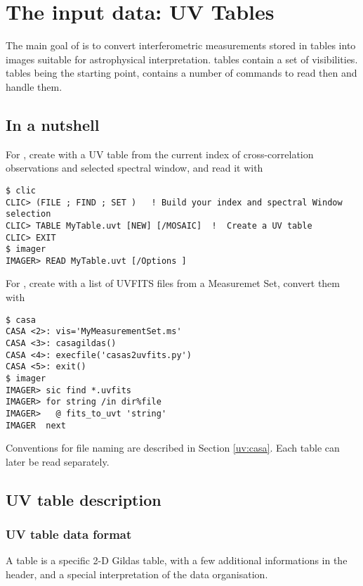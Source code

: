 \section{The input data: UV Tables}
\label{sec:uvtables}

The main goal of \imager{} is to convert interferometric measurements 
stored in \uv{} tables into images suitable for astrophysical interpretation. 
\uv{} tables contain a set of visibilities. \uv{} tables being the
starting point, \imager{} contains a number of commands to read then
and handle them.

\subsection{In a nutshell}

For \NOEMA{}, create with \clic{} a UV table from the current
index of cross-correlation observations and selected spectral window, 
and read it with \imager{}
\begin{verbatim}
$ clic
CLIC> (FILE ; FIND ; SET )   ! Build your index and spectral Window selection
CLIC> TABLE MyTable.uvt [NEW] [/MOSAIC]  !  Create a UV table
CLIC> EXIT
$ imager
IMAGER> READ MyTable.uvt [/Options ]
\end{verbatim}

For \ALMA{}, create with \casa{} a list of UVFITS files from a 
Measuremet Set, convert them with \imager{}
\begin{verbatim}
$ casa
CASA <2>: vis='MyMeasurementSet.ms'
CASA <3>: casagildas()
CASA <4>: execfile('casas2uvfits.py')
CASA <5>: exit()
$ imager
IMAGER> sic find *.uvfits
IMAGER> for string /in dir%file
IMAGER>   @ fits_to_uvt 'string'
IMAGER  next
\end{verbatim}
Conventions for file naming are described in Section \ref{uv:casa}.
Each \uv{} table can later be read separately.


\subsection{UV table description}

\subsubsection{UV table data format}

A \uv{} table is a specific 2-D Gildas table, with a few additional
informations in the header, and a special interpretation of the data
organisation.


